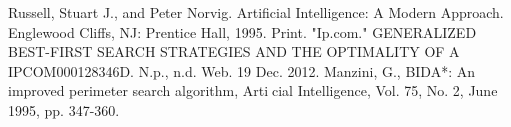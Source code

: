 \documentclass[12pt]{report}
\begin{document}




\newpage
    \renewcommand\bibname{References}
    \begin{thebibliography}{9}
        Russell, Stuart J., and Peter Norvig. Artificial
Intelligence: A Modern Approach. Englewood
Cliffs, NJ: Prentice Hall, 1995. Print.
"Ip.com." GENERALIZED BEST-FIRST SEARCH
STRATEGIES AND THE OPTIMALITY OF A
IPCOM000128346D. N.p., n.d. Web. 19 Dec.
2012. 
Manzini, G., BIDA*: An improved perimeter search algorithm, Articial Intelligence, Vol. 75,
No. 2, June 1995, pp. 347-360.
        
    \end{thebibliography}
\end{document}
